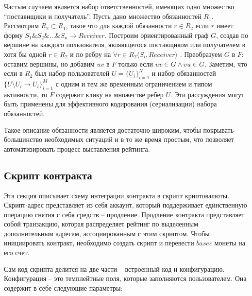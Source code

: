 \documentclass[specification,annotation]{itmo-student-thesis}
\begin{document}
Частым случаем является набор ответственностей, имеющих одно множество
``поставищики и получатель''. Пусть дано множество обязанностей
$R_1$. Рассмотрим $R_2 \subset R_1$, такое что для каждой обязанности
$r \in R_2$ если $r$ имеет форму $S_1\&S_2\&…\&S_n \rightarrow
Receiver$. Построим ориентированный граф $G$, создав по вершине на
каждого пользователя, являющегося поставщиком или получателем в хотя
бы одной $r \in R_2$ и по ребру на $\forall r \in R_2 \langle S_i,
Receiver \rangle$ . Преобразуем $G$ в $F$: оставим вершины, но добавим
$uv$ в $F$ только если $uv \in G \wedge vu \in G$. Заметим, что если в
$R_2$ был набор пользователей $U = \{U_i\}_{i=1}^N$ и набор
обязанностей $\{U \setminus U_i \rightarrow U_i\}_{i=1}^M$ с одним и
тем же временным ограничением и типом активности, то $F$ содержит
клику на множестве ребер $U$. Эти рассуждения могут быть применены для
эффективного кодирования (сериализации) набора обязанностей.

Такое описание обязанности является достаточно широким, чтобы
покрывать большинство необходимых ситуаций и в то же время простым,
что позволяет автоматизировать процесс выставления рейтинга.

\subsection{Скрипт контракта}

Эта секция описывает схему интеграции контракта в скрипт
криптовалюты. Скрипт-адрес представляет из себя аккаунт, который
поддерживает единственную операцию снятия с себя средств --
продление. Продление контракта представляет собой транзакцию, которая
распределяет рейтинг по выделенным дополнительным адресам,
ассоциированным с этим скриптом. Чтобы инициировать контракт,
необходимо создать скрипт и перевести $basec$ монеты на его счет.

Сам код скрипта делится на две части -- встроенный код и
конфигурацию. Конфигурация -- это темплейтные поля, которые
заполняются пользователем. Она содержит в себе следующие параметры:
\end{document}
